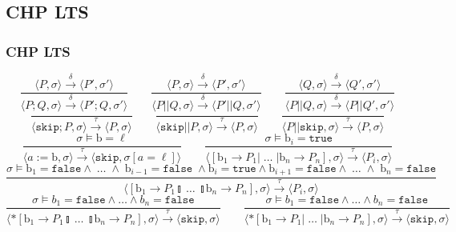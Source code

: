 \documentclass[compress]{beamer}
\begin{document}
\subsection{CHP LTS}
\begin{frame}
    \frametitle{CHP LTS}
    \tiny
    $$
        \frac{\langle P, \sigma \rangle \xrightarrow{\delta} \langle P', \sigma' \rangle}{\langle P ; Q, \sigma \rangle \xrightarrow{\delta} \langle P' ; Q, \sigma' \rangle} \qquad
        \frac{\langle P, \sigma \rangle \xrightarrow{\delta} \langle P', \sigma' \rangle}{\langle P || Q, \sigma \rangle \xrightarrow{\delta} \langle P' || Q, \sigma' \rangle} \qquad
        \frac{\langle Q, \sigma \rangle \xrightarrow{\delta} \langle Q', \sigma' \rangle}{\langle P || Q, \sigma \rangle \xrightarrow{\delta} \langle P || Q', \sigma' \rangle} $$$$
        \frac{}{\langle \mathtt{skip}; P, \sigma \rangle \xrightarrow{\tau} \langle P, \sigma \rangle} \qquad
        \frac{}{\langle \mathtt{skip} || P, \sigma \rangle \xrightarrow{\tau} \langle P, \sigma \rangle} \qquad
        \frac{}{\langle P || \mathtt{skip}, \sigma \rangle \xrightarrow{\tau} \langle P, \sigma \rangle} $$$$
        \frac{\sigma \models \mathrm{b} = \ell}{\langle a := \mathrm{b}, \sigma \rangle \xrightarrow{\tau} \langle \mathtt{skip}, \sigma[a = \ell] \rangle} \qquad
        \frac{\sigma \models \mathrm{b}_i = \mathtt{true}} {\langle [\mathrm{b}_1 \rightarrow P_1  | \; \ldots \; | \mathrm{b}_n \rightarrow P_n ] , \sigma \rangle \xrightarrow{\tau} \langle P_i , \sigma\rangle  } $$$$
        \frac{\sigma \models \mathrm{b}_1 = \mathtt{false} \wedge \; \ldots \; \wedge \; \mathrm{b}_{i-1} = \mathtt{false} \; \wedge \mathrm{b}_i = \mathtt{true} \wedge \mathrm{b}_{i+1} = \mathtt{false} \wedge \; \ldots \; \wedge \; \mathrm{b}_n = \mathtt{false}} {\langle [ \mathrm{b}_1 \rightarrow P_1  \talloblong \; \ldots \; \talloblong \mathrm{b}_n \rightarrow P_n ] , \sigma \rangle \xrightarrow{\tau} \langle P_i , \sigma\rangle  } $$$$
        \frac{\sigma \models b_1 = \mathtt{false} \wedge \ldots \wedge b_n = \mathtt{false}}{\langle *[ \mathrm{b}_1 \rightarrow P_1  \talloblong \; \ldots \; \talloblong \mathrm{b}_n \rightarrow P_n ] , \sigma \rangle \xrightarrow{\tau} \langle \mathtt{skip} , \sigma\rangle } \qquad
        \frac{\sigma \models b_1 = \mathtt{false} \wedge \ldots \wedge b_n = \mathtt{false}}{\langle *[ \mathrm{b}_1 \rightarrow P_1  | \; \ldots \; | \mathrm{b}_n \rightarrow P_n ] , \sigma \rangle \xrightarrow{\tau} \langle \mathtt{skip} , \sigma \rangle } $$$$
$$
\end{frame}
\end{document}
